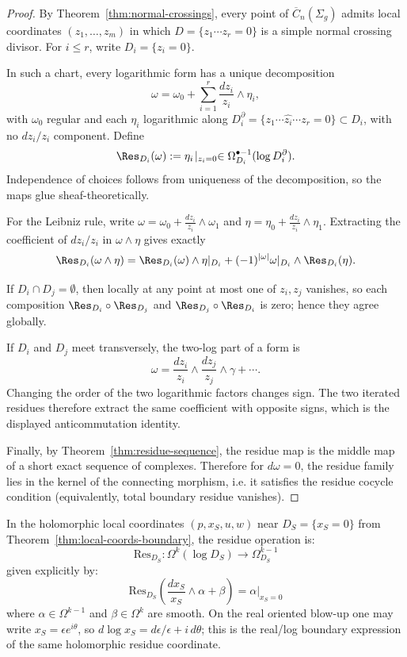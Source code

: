 \begin{proof}
By Theorem~\ref{thm:normal-crossings}, every point of $\overline{C}_n(\Sigma_g)$
admits local coordinates $(z_1,\dots,z_m)$ in which
$D=\{z_1\cdots z_r=0\}$ is a simple normal crossing divisor.
For $i\le r$, write $D_i=\{z_i=0\}$.

In such a chart, every logarithmic form has a unique decomposition
\[
\omega=\omega_0+\sum_{i=1}^r \frac{dz_i}{z_i}\wedge \eta_i,
\]
with $\omega_0$ regular and each $\eta_i$ logarithmic along
$D_i^\partial=\{z_1\cdots \widehat{z_i}\cdots z_r=0\}\subset D_i$, with no
$dz_i/z_i$ component. Define
\[
\Res_{D_i}(\omega):=\eta_i\!\mid_{z_i=0}\in
\Omega^{\bullet-1}_{D_i}(\log D_i^\partial).
\]
Independence of choices follows from uniqueness of the decomposition, so the maps
glue sheaf-theoretically.

For the Leibniz rule, write
$\omega=\omega_0+\frac{dz_i}{z_i}\wedge\omega_1$ and
$\eta=\eta_0+\frac{dz_i}{z_i}\wedge\eta_1$.
Extracting the coefficient of $dz_i/z_i$ in $\omega\wedge\eta$ gives exactly
\[
\Res_{D_i}(\omega\wedge\eta)=
\Res_{D_i}(\omega)\wedge \eta|_{D_i}
 +(-1)^{|\omega|}\omega|_{D_i}\wedge\Res_{D_i}(\eta).
\]

If $D_i\cap D_j=\emptyset$, then locally at any point at most one of $z_i,z_j$
vanishes, so each composition
$\Res_{D_i}\circ\Res_{D_j}$ and $\Res_{D_j}\circ\Res_{D_i}$ is zero; hence they
agree globally.

If $D_i$ and $D_j$ meet transversely, the two-log part of a form is
\[
\omega=\frac{dz_i}{z_i}\wedge\frac{dz_j}{z_j}\wedge\gamma+\cdots .
\]
Changing the order of the two logarithmic factors changes sign. The
two iterated residues therefore extract the same coefficient with
opposite signs, which is the displayed anticommutation identity.

Finally, by Theorem~\ref{thm:residue-sequence}, the residue map is the middle map
of a short exact sequence of complexes. Therefore for $d\omega=0$, the residue
family lies in the kernel of the connecting morphism, i.e. it satisfies the
residue cocycle condition (equivalently, total boundary residue vanishes).
\end{proof}

\begin{proposition}\label{prop:residue-local}
In the holomorphic local coordinates $(p,x_S,u,w)$ near
$D_S=\{x_S=0\}$ from Theorem~\ref{thm:local-coords-boundary}, the
residue operation is:
\[\text{Res}_{D_S}: \Omega^k(\log D_S) \to \Omega^{k-1}_{D_S}\]
given explicitly by:
\[\text{Res}_{D_S}\left(\frac{dx_S}{x_S} \wedge \alpha + \beta\right) = \alpha|_{x_S=0}\]
where $\alpha \in \Omega^{k-1}$ and $\beta \in \Omega^k$ are smooth.
On the real oriented blow-up one may write
$x_S=\epsilon e^{i\theta}$, so
$d\log x_S=d\epsilon/\epsilon+i\,d\theta$; this is the real/log
boundary expression of the same holomorphic residue coordinate.
\end{proposition}

